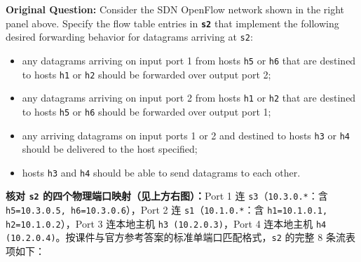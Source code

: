 \textbf{Original Question:} Consider the SDN OpenFlow network shown in the right panel above. Specify the flow table entries in \textbf{\texttt{s2}} that implement the following desired forwarding behavior for datagrams arriving at \texttt{s2}:
\begin{itemize}
\item any datagrams arriving on input port 1 from hosts \texttt{h5} or \texttt{h6} that are destined to hosts \texttt{h1} or \texttt{h2} should be forwarded over output port 2;
\item any datagrams arriving on input port 2 from hosts \texttt{h1} or \texttt{h2} that are destined to hosts \texttt{h5} or \texttt{h6} should be forwarded over output port 1;
\item any arriving datagrams on input ports 1 or 2 and destined to hosts \texttt{h3} or \texttt{h4} should be delivered to the host specified;
\item hosts \texttt{h3} and \texttt{h4} should be able to send datagrams to each other.
\end{itemize}

\textbf{核对 \texttt{s2} 的四个物理端口映射（见上方右图）：}Port 1 连 \texttt{s3}（\texttt{10.3.0.*}：含 \texttt{h5=10.3.0.5, h6=10.3.0.6}），Port 2 连 \texttt{s1}（\texttt{10.1.0.*}：含 \texttt{h1=10.1.0.1, h2=10.1.0.2}），Port 3 连本地主机 \texttt{h3 (10.2.0.3)}，Port 4 连本地主机 \texttt{h4 (10.2.0.4)}。按课件与官方参考答案的标准单端口匹配格式，\texttt{s2} 的完整 8 条流表项如下：

